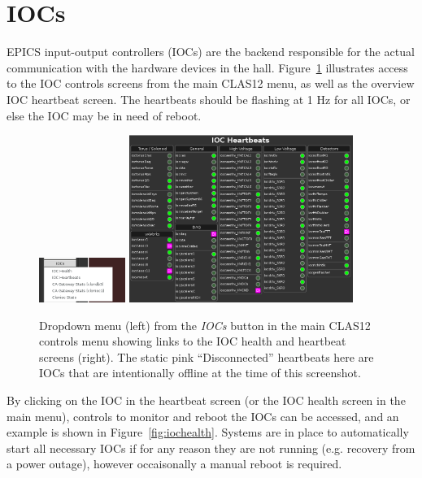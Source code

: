 \documentclass[amsmath,amssymb,notitlepage,11pt]{revtex4}
\begin{document}
\clearpage

\section{IOCs}
EPICS input-output controllers (IOCs) are the backend responsible for the actual communication with the hardware devices in the hall.  Figure~\ref{fig:iocmenu} illustrates access to the IOC controls screens from the main CLAS12 menu, as well as the overview IOC heartbeat screen.  The heartbeats should be flashing at 1 Hz for all IOCs, or else the IOC may be in need of reboot.  

\begin{figure}[htbp]\centering
  \includegraphics[width=0.25\textwidth]{pics/iocmenu}
  \includegraphics[width=0.65\textwidth]{pics/iocbeats}
  \caption{Dropdown menu (left) from the {\em IOCs} button in the main CLAS12 controls menu showing links to the IOC health and heartbeat screens (right).  The static pink ``Disconnected'' heartbeats here are IOCs that are intentionally offline at the time of this screenshot.\label{fig:iocmenu}}
\end{figure}

By clicking on the IOC in the heartbeat screen (or the IOC health screen in the main menu), controls to monitor and reboot the IOCs can be accessed, and an example is shown in Figure~\ref{fig:iochealth}.  Systems are in place to automatically start all necessary IOCs if for any reason they are not running (e.g. recovery from a power outage), however occaisonally a manual reboot is required.
\end{document}
